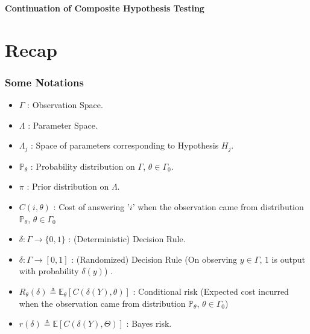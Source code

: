 \documentclass[12pt]{report}
\begin{document}
\maketitle

\begin{center}
{\Large \bf Continuation of Composite Hypothesis Testing}
\end{center}

\section{Recap}


\subsubsection{Some Notations}
\begin{itemize}
    \item $\Gamma$ : Observation Space.
    \item $\Lambda$ : Parameter Space.
    \item $\Lambda_j$ : Space of parameters corresponding to Hypothesis $H_j$.
    \item $\mathbb{P}_{\theta}$ : Probability distribution on $\Gamma$, $\theta \in \Gamma_{0}$.
    \item $\pi$ : Prior distribution on $\Lambda$.
    \item $C(i,\theta)$ : Cost of answering '$i$' when the observation came from distribution $\mathbb{P}_{\theta}$, $\theta \in \Gamma_{0}$
    \item $\delta: \Gamma \to \{0, 1\}$ : (Deterministic) Decision Rule.
    \item $\delta: \Gamma \to [0, 1]$ : (Randomized) Decision Rule (On observing $y \in \Gamma$,  $1$ is output with probability $\delta(y)$) .
    \item $R_{\theta}(\delta) \triangleq \mathbb{E}_{\theta}[C(\delta(Y),\theta)]$ : Conditional risk (Expected cost incurred when the observation came from distribution $\mathbb{P}_{\theta}$, $\theta \in \Gamma_{0}$)
    \item $r(\delta) \triangleq \mathbb{E}[C(\delta(Y),\Theta)]$ : Bayes risk.
    
\end{itemize}
\end{document}
